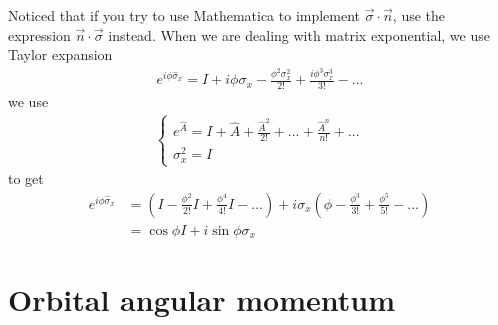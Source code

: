 \documentclass[UTF8,12pt]{article} %
\begin{document}
Noticed that if you try to use Mathematica to implement $\vec{\sigma}\cdot\vec{n}$, use the expression $\vec{n}\cdot\vec{\sigma}$ instead. When we are dealing with matrix exponential, we use Taylor expansion
\begin{align}
e^{i\phi\hat{\sigma}_{x}} = I + i\phi \sigma_{x} - \frac{\phi^{2}\sigma_{x}^{2}}{2!} + \frac{i\phi^{3}\sigma_{x}^{3}}{3!} - ...
\end{align}
we use
\begin{align}
\begin{cases}
e^{\hat{A}} = I + \hat{A} + \frac{\hat{A}^{2}}{2!} + ... + \frac{\hat{A}^{n}}{n!} + ...\\
\sigma_{x}^{2} = I
\end{cases}
\end{align}
to get
\begin{align}
e^{i\phi\hat{\sigma}_{x}} &= \left(I - \frac{\phi^{2}}{2!}I + \frac{\phi^{4}}{4!}I - ...\right) + i\sigma_{x} \left(\phi - \frac{\phi^{3}}{3!} + \frac{\phi^{5}}{5!} - ...\right) \\
&= \cos\phi I + i\sin\phi\sigma_{x}
\end{align}

\section{Orbital angular momentum}
\end{document}

